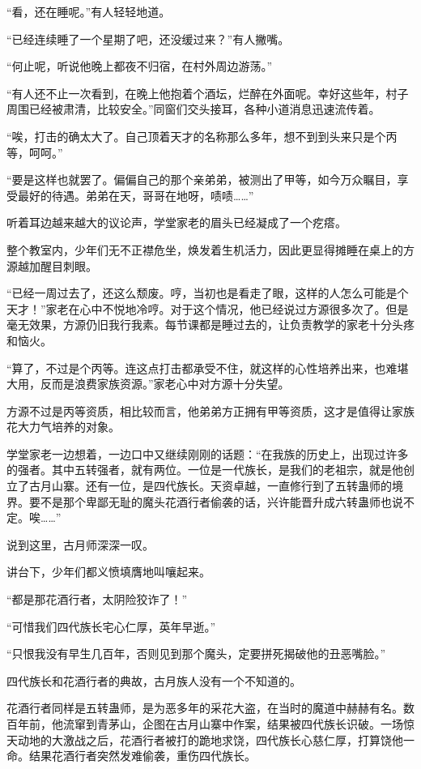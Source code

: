\begin{this_body}
“看，还在睡呢。”有人轻轻地道。

“已经连续睡了一个星期了吧，还没缓过来？”有人撇嘴。

“何止呢，听说他晚上都夜不归宿，在村外周边游荡。”

“有人还不止一次看到，在晚上他抱着个酒坛，烂醉在外面呢。幸好这些年，村子周围已经被肃清，比较安全。”同窗们交头接耳，各种小道消息迅速流传着。

“唉，打击的确太大了。自己顶着天才的名称那么多年，想不到到头来只是个丙等，呵呵。”

“要是这样也就罢了。偏偏自己的那个亲弟弟，被测出了甲等，如今万众瞩目，享受最好的待遇。弟弟在天，哥哥在地呀，啧啧……”

听着耳边越来越大的议论声，学堂家老的眉头已经凝成了一个疙瘩。

整个教室内，少年们无不正襟危坐，焕发着生机活力，因此更显得摊睡在桌上的方源越加醒目刺眼。

“已经一周过去了，还这么颓废。哼，当初也是看走了眼，这样的人怎么可能是个天才！”家老在心中不悦地冷哼。对于这个情况，他已经说过方源很多次了。但是毫无效果，方源仍旧我行我素。每节课都是睡过去的，让负责教学的家老十分头疼和恼火。

“算了，不过是个丙等。连这点打击都承受不住，就这样的心性培养出来，也难堪大用，反而是浪费家族资源。”家老心中对方源十分失望。

方源不过是丙等资质，相比较而言，他弟弟方正拥有甲等资质，这才是值得让家族花大力气培养的对象。

学堂家老一边想着，一边口中又继续刚刚的话题：“在我族的历史上，出现过许多的强者。其中五转强者，就有两位。一位是一代族长，是我们的老祖宗，就是他创立了古月山寨。还有一位，是四代族长。天资卓越，一直修行到了五转蛊师的境界。要不是那个卑鄙无耻的魔头花酒行者偷袭的话，兴许能晋升成六转蛊师也说不定。唉……”

说到这里，古月师深深一叹。

讲台下，少年们都义愤填膺地叫嚷起来。

“都是那花酒行者，太阴险狡诈了！”

“可惜我们四代族长宅心仁厚，英年早逝。”

“只恨我没有早生几百年，否则见到那个魔头，定要拼死揭破他的丑恶嘴脸。”

四代族长和花酒行者的典故，古月族人没有一个不知道的。

花酒行者同样是五转蛊师，是为恶多年的采花大盗，在当时的魔道中赫赫有名。数百年前，他流窜到青茅山，企图在古月山寨中作案，结果被四代族长识破。一场惊天动地的大激战之后，花酒行者被打的跪地求饶，四代族长心慈仁厚，打算饶他一命。结果花酒行者突然发难偷袭，重伤四代族长。


\end{this_body}
